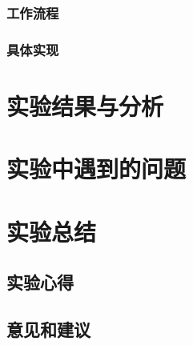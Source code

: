 \documentclass[paper=a4, fontsize=11pt, UTF8]{article} %
\begin{document}
\subsubsection{工作流程}

\subsubsection{具体实现}


\section{实验结果与分析}

\section{实验中遇到的问题}



\section{实验总结}
\subsection{实验心得}
\subsection{意见和建议}
\end{document}
